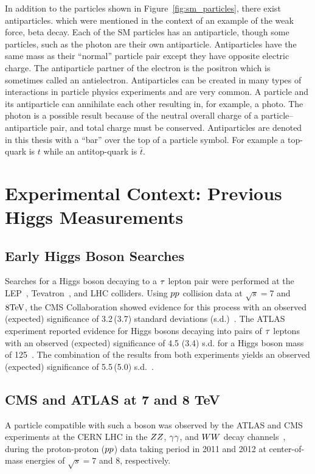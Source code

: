 In addition to the particles shown in Figure~\ref{fig:sm_particles}, there exist antiparticles.
which were mentioned in the context of an example of the weak force, beta decay.
Each of the SM particles has an antiparticle, though some particles, such as the photon
are their own antiparticle. Antiparticles have the same mass as their
``normal'' particle pair except they have opposite electric charge. The antiparticle
partner of the electron is the positron which is sometimes called an antielectron.
Antiparticles can be created in many types of interactions in particle physics experiments
and are very common. A particle and its antiparticle can annihilate each other resulting in,
for example, a photo. The photon is a possible result because of the neutral overall charge
of a particle--antiparticle pair, and total charge must be conserved.
Antiparticles are denoted in this thesis with a ``bar'' over the top of a particle symbol. For example
a top-quark is $t$ while an antitop-quark is $\bar{t}$.


\section{Experimental Context: Previous Higgs Measurements}

\subsection{Early Higgs Boson Searches}
Searches for a Higgs boson decaying to a $\tau$ lepton pair were performed at the LEP~\cite{Barate:2000ts,Abdallah:2003ip,Achard:2001pj,Abbiendi:2000ac},
Tevatron~\cite{Aaltonen:2012jh, Abazov:2012zj}, and LHC colliders.
Using $pp$ collision data at $\sqrt{s}=7$ and $8\mathrm{TeV}$, the CMS Collaboration showed evidence for this process with an observed\,(expected)
significance of 3.2\,(3.7) standard deviations (s.d.)~\cite{Chatrchyan:2014nva}. The ATLAS
experiment reported evidence for Higgs bosons decaying into pairs
of $\tau$ leptons with an observed (expected) significance of 4.5 (3.4)
s.d. for a Higgs boson mass of 125\GeV~\cite{Aad:2015vsa}.
The combination of the results from both experiments yields an observed (expected)
significance of 5.5\,(5.0) s.d.~\cite{Khachatryan:2016vau}.

\subsection{CMS and ATLAS at 7 and 8 TeV}
A particle compatible with such a boson was observed by the ATLAS and CMS experiments at the CERN LHC
in the $ZZ$, $\gamma \gamma$, and $WW$ decay channels~\cite{Aad:2012tfa, Chatrchyan:2012xdj, Chatrchyan:2013lba},
during the proton-proton ($pp$) data taking period in 2011 and 2012
at center-of-mass energies of $\sqrt{s} = 7$ and 8\TeV, respectively.

